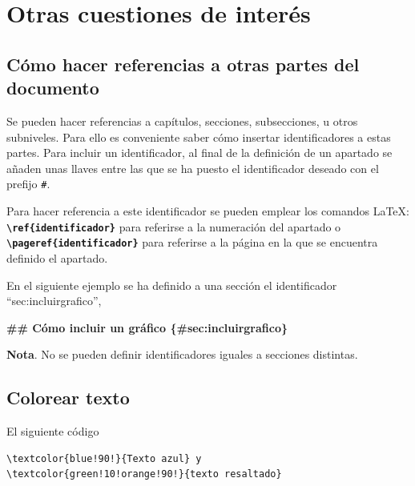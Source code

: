 \documentclass[12pt,a4paper,]{book}
\newenvironment{Shaded}{\begin{snugshade}}{\end{snugshade}}
\newcommand{\FunctionTok}[1]{\textcolor[rgb]{0.13,0.29,0.53}{\textbf{#1}}}
\numberwithin{dummy}{section}
\theoremstyle{ocrenumbox}
\theoremstyle{blacknumex}
\theoremstyle{blacknumbox}
\theoremstyle{ocrenum}
\theoremstyle{ocrenum}
\begin{document}
\hypertarget{otras-cuestiones-de-interuxe9s}{%
\section{Otras cuestiones de
interés}\label{otras-cuestiones-de-interuxe9s}}

\hypertarget{cuxf3mo-hacer-referencias-a-otras-partes-del-documento}{%
\subsection{Cómo hacer referencias a otras partes del
documento}\label{cuxf3mo-hacer-referencias-a-otras-partes-del-documento}}

Se pueden hacer referencias a capítulos, secciones, subsecciones, u
otros subniveles. Para ello es conveniente saber cómo insertar
identificadores a estas partes. Para incluir un identificador, al final
de la definición de un apartado se añaden unas llaves entre las que se
ha puesto el identificador deseado con el prefijo \texttt{\#}.

Para hacer referencia a este identificador se pueden emplear los
comandos LaTeX: \textbf{\texttt{\textbackslash{}ref\{identificador\}}}
para referirse a la numeración del apartado o
\textbf{\texttt{\textbackslash{}pageref\{identificador\}}} para
referirse a la página en la que se encuentra definido el apartado.

En el siguiente ejemplo se ha definido a una sección el identificador
``sec:incluirgrafico'',

\begin{Shaded}
\begin{Highlighting}[]
\FunctionTok{\#\# Cómo incluir un gráfico \{\#sec:incluirgrafico\}}
\end{Highlighting}
\end{Shaded}

\textbf{Nota}. No se pueden definir identificadores iguales a secciones
distintas.

\hypertarget{colorear-texto}{%
\subsection{Colorear texto}\label{colorear-texto}}

El siguiente código

\begin{verbatim}
\textcolor{blue!90!}{Texto azul} y 
\textcolor{green!10!orange!90!}{texto resaltado}
\end{verbatim}
\end{document}
